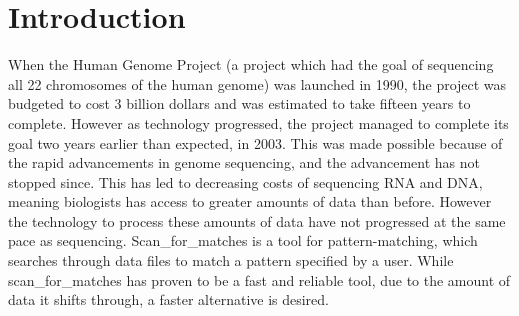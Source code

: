 \section{Introduction}%
When the Human Genome Project (a project which had the goal of sequencing 
all 22 chromosomes of the human genome) was launched in 1990, the project was 
budgeted to cost 3 billion dollars and was estimated to take fifteen years 
to complete. However as technology progressed, the project managed to complete 
its goal two years earlier than expected, in 2003. This was made possible 
because of the rapid advancements in genome sequencing, and the advancement 
has not stopped since. This has led to decreasing costs of sequencing RNA and DNA, 
meaning biologists has access to greater amounts of data than before. 
However the technology to process these amounts of data have not progressed at 
the same pace as sequencing. Scan\_for\_matches is a tool for pattern-matching, 
which searches through data files to match a pattern specified by a user. 
While scan\_for\_matches has proven to be a fast and reliable 
tool, due to the amount of data it shifts through, a faster alternative 
is desired.\begin{comment}
After hearing about this problem, we thought that there must be a better 
way of searching through data that is also theoretically sound. Our first 
thought was using automata-based searching methods, since this provides a 
calculable best- and worst-case run time while being theoretically sound. 
Since regular expressions uses an automata-based way of searching, we hypothesized 
that implementing regular expressions which have the same functions as 
scan\_for\_matches would lead to faster run times.
\end{comment}

